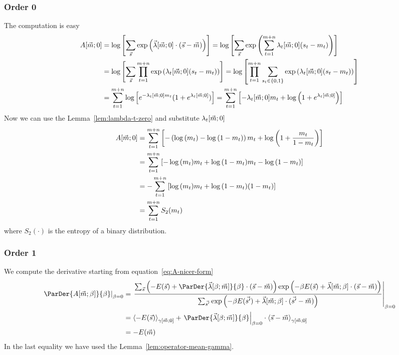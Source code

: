 \subsubsection{Order 0}
The computation is easy
\begin{align*}
  A{\left[\vec{m};0\right]}
  &= \log{\left[\sum_{\vec{s}}\exp{\left(\vec{\lambda}{\left[\vec{m};0\right]}\cdot(\vec{s}-\vec{m})\right)}\right]}
   = \log{\left[\sum_{\vec{s}}\exp{\left(\sum_{t=1}^{m+n}\lambda_t{\left[\vec{m};0\right]}(s_t-m_t)\right)}\right]}\\
  &= \log{\left[\sum_{\vec{s}}\prod_{t=1}^{m+n}\exp{\left(\lambda_t{\left[\vec{m};0\right]}(s_t-m_t)\right)}\right]}
   = \log{\left[\prod_{t=1}^{m+n}\sum_{s_t \in \{0,1\}}\exp{\left(\lambda_t{\left[\vec{m};0\right]}(s_t-m_t)\right)}\right]}\\
  &= \sum_{t=1}^{m+n}\log{\left[e^{-\lambda_t{\left[\vec{m};0\right]}m_t}(1+e^{\lambda_t{\left[\vec{m};0\right]}})\right]}
   = \sum_{t=1}^{m+n}\left[-\lambda_t{\left[\vec{m};0\right]} m_t + \log{\left(1+e^{\lambda_t{\left[\vec{m};0\right]}}\right)}\right]
\end{align*}
Now we can use the Lemma~\ref{lem:lambda-t-zero} and substitute \(\lambda_t{\left[\vec{m};0\right]}\)
\begin{align*}
  A{\left[\vec{m};0\right]}
  &= \sum_{t=1}^{m+n}\left[-\left(\log{\left(m_t\right)} - \log{\left(1-m_t\right)}\right) m_t
                + \log{\left(1+\frac{m_t}{1-m_t}\right)}\right] \\
  &= \sum_{t=1}^{m+n}\left[-\log{\left(m_t\right)}m_t + \log{\left(1-m_t\right)}m_t
                - \log{\left(1-m_t\right)}\right] \\
  &= -\sum_{t=1}^{m+n}\left[\log{\left(m_t\right)}m_t + \log{\left(1-m_t\right)}(1-m_t)\right] \\
  &= \sum_{t=1}^{m+n} S_2{(m_t)}
\end{align*}
where \(S_2{(\cdot)}\) is the entropy of a binary distribution.

\subsubsection{Order 1}
We compute the derivative starting from equation~\eqref{eq:A-nicer-form}
\begin{align*}
  \left.\ParDer{A{\left[\vec{m};\beta\right]}}{\beta}\right|_{\beta=0}
  &= \left.
    \frac{
      \sums\left(-E{(\vec{s})}+\ParDer{\Lambd{\beta}{\vec{m}}}{\beta}\cdot(\vec{s}-\vec{m})\right)\GammaExp{}
    }{
      \sum_{\vec{s'}}\GammaExp{'}
    }\right|_{\beta=0}\\
  &= \Gmean{-E{(\vec{s})}}{\vec{m}}{0} +
     \left.\ParDer{\Lambd{\beta}{\vec{m}}}{\beta}\right|_{\beta=0}\cdot\Gmean{\vec{s}-\vec{m}}{\vec{m}}{0}\\
  &= -E{(\vec{m})}
\end{align*}
In the last equality we have used the Lemma~\ref{lem:operator-mean-gamma}.

